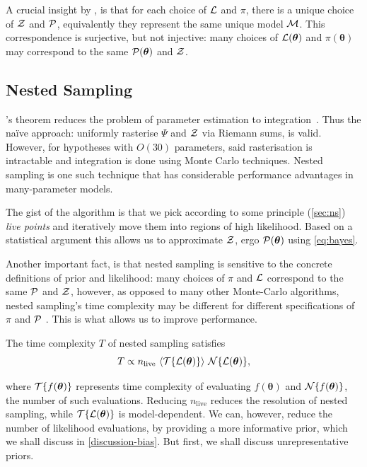 \documentclass[usenatbib]{mnras}
\begin{document}
A crucial insight by \cite{chen-ferroz-hobson}, is that for each
choice of ${\cal L}$ and $\pi$, there is a unique choice of ${\cal Z}$
and ${\cal P}$, equivalently they represent the same unique model
${\cal M}$. This correspondence is surjective, but not injective: many
choices of \({\cal L}(\bm{\theta})\) and \(\pi (\bm{\theta})\) may
correspond to the same \( {\cal P} (\bm{\theta})\) and \({\cal Z}\). 


\subsection{Nested Sampling}\label{sec:org36366f8}

\citeauthor{1763}'s theorem reduces the problem of parameter
estimation to integration~\citep{bayes-integration}. Thus the naïve
approach: uniformly rasterise \(\Psi\) and \({\cal Z}\) via Riemann
sums, is valid. However, for hypotheses with \(O(30)\) parameters,
said rasterisation is intractable \citep{Caflisch_1998} and
integration is done using Monte Carlo techniques. Nested sampling is
one such technique that has considerable performance advantages in
many-parameter models.

The gist of the algorithm \citep{Skilling2006} is that we pick according
to some principle (\cref{sec:ns}) \emph{live points} and iteratively
move them into regions of high likelihood. Based on a statistical
argument this allows us to approximate ${\cal Z}$, ergo
${\cal P}(\bm{\theta})$ using \cref{eq:bayes}.

Another important fact, is that nested sampling is sensitive to the
concrete definitions of prior and likelihood: many choices of $\pi$
and ${\cal L}$ correspond to the same ${\cal P}$ and ${\cal Z}$,
however, as opposed to many other Monte-Carlo algorithms, nested
sampling's time complexity may be different for different
specifications of $\pi$ and ${\cal P}$
\citep{chen-ferroz-hobson}. This is what allows us to improve
performance.

The time complexity $T$ of nested sampling satisfies
\begin{equation}\label{eq:complexity}
    T \propto  n_\text{live}\  \langle {\cal T}\{{\cal L}(\bm{\theta})\} \rangle \ {\cal N}\{{\cal L}(\bm{\theta}) \},
\end{equation}

where ${\cal T}\{f(\bm{\theta})\}$ represents time complexity of
evaluating $f(\bm{\theta})$ and ${\cal N}\{f(\bm{\theta})\}$, the
number of such evaluations. Reducing $n_\text{live}$ reduces the
resolution of nested sampling, while
$ {\cal T}\{{\cal L}(\bm{\theta})\}$ is model-dependent. We can,
however, reduce the number of likelihood evaluations, by providing a
more informative prior, which we shall discuss in
\cref{discussion-bias}. But first, we shall discuss unrepresentative
priors.
\end{document}
